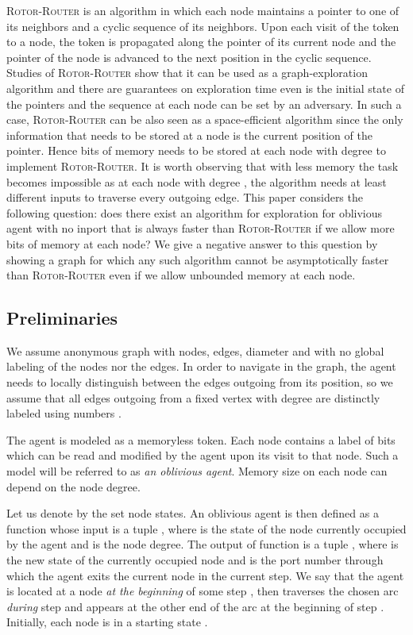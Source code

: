 \documentclass{article}[11pt,letter]
\newcommand{\RR}{{\textsc{Rotor-Router}}\xspace}
\begin{document}
\RR is an algorithm in which each node maintains a pointer to one of its neighbors and a cyclic sequence of its neighbors. Upon each visit of the token to a node, the token is propagated along the pointer of its current node and the pointer of the node is advanced to the next position in the cyclic sequence. Studies of \RR show that it can be used as a graph-exploration algorithm and there are guarantees on exploration time even is the initial state of the pointers and the sequence at each node can be set by an adversary. In such a case, \RR can be also seen as a space-efficient algorithm since the only information that needs to be stored at a node is the current position of the pointer. Hence  bits of memory needs to be stored at each node with degree  to implement \RR. It is worth observing that with less memory the task becomes impossible as at each node with degree , the algorithm needs at least  different inputs to traverse every outgoing edge. This paper considers the following question: does there exist an algorithm for exploration for oblivious agent with no inport that is always faster than \RR if we allow more bits of memory at each node? We give a negative answer to this question by showing a graph for which any such algorithm cannot be asymptotically faster than \RR even if we allow unbounded memory at each node.









\subsection{Preliminaries}
We assume anonymous graph  with  nodes,  edges, diameter  and with no global labeling of the nodes nor the edges. In order to navigate in the graph, the agent needs to locally distinguish between the edges outgoing from its position, so we assume that all edges outgoing from a fixed vertex with degree  are distinctly labeled using numbers . 

The agent is modeled as a memoryless token. Each node contains a label of  bits which can be read and modified by the agent upon its visit to that node. Such a model will be referred to as \emph{an oblivious agent}. Memory size on each node can depend on the node degree.

Let us denote by  the set node states. An oblivious agent is then defined as a function  whose input is a tuple , where  is the state of the node currently occupied by the agent and  is the node degree. The output of function  is a tuple , where  is the new state of the currently occupied node and  is the port number through which the agent exits the current node in the current step. We say that the agent is located at a node  \textit{at the beginning} of some step , then traverses the chosen arc \textit{during} step  and appears at the other end of the arc at the beginning of step . Initially, each node is in a starting state . 
\end{document}
